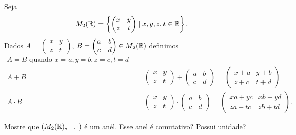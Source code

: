 \documentclass[12pt]{exam}
\begin{document}
\questao Seja
\[
    M_2(\mathbb{R}) = \left\{\begin{pmatrix}
        x & y\\z & t 
    \end{pmatrix} \mid x, y, z, t \in \mathbb{R} \right\}.
\]
Dados $A = \begin{pmatrix}
        x & y\\z & t 
    \end{pmatrix}$, $B = \begin{pmatrix}
        a & b\\c & d 
    \end{pmatrix} \in M_2(\mathbb{R})$ definimos
\begin{align*}
    A = B \mbox{ quando } x = a, y = b, z = c, t = d\\
    A + B &= \begin{pmatrix}
        x & y\\z & t 
    \end{pmatrix} + \begin{pmatrix}
        a & b\\c & d 
    \end{pmatrix} = \begin{pmatrix}
        x + a & y + b\\z + c & t + d 
    \end{pmatrix}\\
    A \cdot B &= \begin{pmatrix}
        x & y\\z & t 
    \end{pmatrix} \cdot \begin{pmatrix}
        a & b\\c & d 
    \end{pmatrix} = \begin{pmatrix}
        xa + yc & xb + yd\\za + tc & zb + td 
    \end{pmatrix}.
\end{align*}

Mostre que $(M_2(\mathbb{R}), + , \cdot)$ \'e um an\'el. Esse anel \'e comutativo? Possui unidade?
\end{document}
